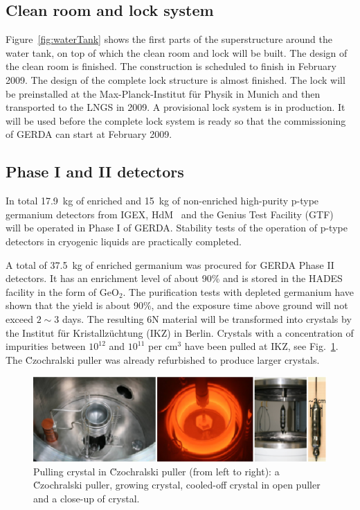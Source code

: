 \subsection{Clean room and lock system}
\label{sec:gerda:stat2}
Figure~\ref{fig:waterTank} shows the first parts of the superstructure around the water tank, on top of which the clean room and lock will be built. The design of the clean room is finished. The construction is scheduled to finish in February 2009. The design of the complete lock structure is almost finished. The lock will be preinstalled at the Max-Planck-Institut f\"ur Physik in Munich and then transported to the LNGS in 2009. A provisional lock system is in production. It will be used before the complete lock system is ready so that the commissioning of GERDA can start at February 2009.

\subsection{Phase I and II detectors}
\label{sec:gerda:stat3}
In total 17.9~kg of enriched and 15~kg of non-enriched high-purity p-type germanium detectors from IGEX\cite{Aal02}, HdM~\cite{Hei04} and the Genius Test Facility (GTF)~\cite{Kla02} will be operated in Phase I of GERDA. Stability tests of the operation of p-type detectors in cryogenic liquids are practically completed. 

A total of 37.5~kg of enriched germanium was procured for GERDA Phase II detectors. It has an enrichment level of about 90\% and is stored in the HADES facility in the form of GeO$_{2}$. The purification tests with depleted germanium have shown that the yield is about 90\%, and the exposure time above ground will not exceed $2 \sim 3$ days. The resulting 6N material will be transformed into crystals by the Institut f\"ur Kristallz\"uchtung (IKZ) in Berlin. Crystals with a concentration of impurities between $10^{12}$ and $10^{11}$ per cm$^{3}$ have been pulled at IKZ, see Fig.~\ref{fig:pulling}. The \u{C}zochralski puller was already refurbished to produce larger crystals.
\begin{figure}[tbhp]
  \centering
  \includegraphics[width=\textwidth]{crystalPulling}
  \caption{Pulling crystal in \u{C}zochralski puller (from left to     right): a \u{C}zochralski puller, growing crystal, cooled-off     crystal in open puller and a close-up of crystal.}
  \label{fig:pulling}
\end{figure}

